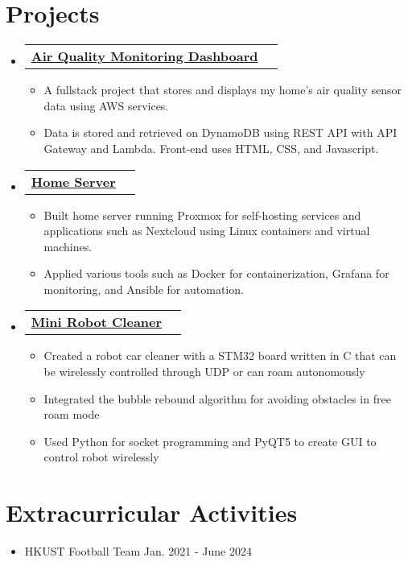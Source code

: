\documentclass[letterpaper,12pt]{article}
\makeatletter
\newcommand{\resumeItem}[1]{
  \item\small{
    {#1 \vspace{-2pt}}
  }
}
\newcommand{\resumeProjectHeading}[2]{
    \item
    \begin{tabular*}{0.97\textwidth}{l@{\extracolsep{\fill}}r}
      \small#1 & #2 \\
    \end{tabular*}\vspace{-7pt}
}
\newcommand{\resumeSubHeadingListStart}{\begin{itemize}[leftmargin=0.05in, label={}]}
\newcommand{\resumeSubHeadingListEnd}{\end{itemize}}
\newcommand{\resumeItemListStart}{\begin{itemize}}
\newcommand{\resumeItemListEnd}{\end{itemize}\vspace{-5pt}}
\makeatother
\begin{document}
\section{Projects}
    \resumeSubHeadingListStart
      

    \resumeProjectHeading
    {\textbf{\href{https://airqualitydashboard.jyylab.com/}{ {Air Quality Monitoring Dashboard}}}    \emph{}}{}
    \resumeItemListStart
      \resumeItem{\normalsize{A fullstack project that stores and displays my home's air quality sensor data using AWS services.}} 
      \resumeItem{\normalsize{Data is stored and retrieved on DynamoDB using REST API with API Gateway and Lambda. Front-end uses HTML, CSS, and Javascript.}}
    \resumeItemListEnd

      \resumeProjectHeading
      {\textbf{\href{https://github.com/jamesyoung-15/homeserver}{ {Home Server}}} \emph{}}{}
      \resumeItemListStart
        \resumeItem{\normalsize{Built home server running Proxmox for self-hosting services and applications such as Nextcloud using Linux containers and virtual machines.}}
        \resumeItem{\normalsize{Applied various tools such as Docker for containerization, Grafana for monitoring, and Ansible for automation.}}
      \resumeItemListEnd

    \resumeProjectHeading
    {\textbf{\href{https://github.com/jamesyoung-15/Mini-Robot-Cleaner}{ {Mini Robot Cleaner}}}    \emph{}}{}
    \resumeItemListStart
      \resumeItem{\normalsize{Created a robot car cleaner with a STM32 board written in C that can be wirelessly controlled through UDP or can roam autonomously}} 
      \resumeItem{\normalsize{Integrated the bubble rebound algorithm for avoiding obstacles in free roam mode}}
      \resumeItem{\normalsize{Used Python for socket programming and PyQT5 to create GUI to control robot wirelessly}}
    \resumeItemListEnd



    \resumeSubHeadingListEnd




\section{Extracurricular Activities}
    \begin{itemize}[itemsep=-2pt, parsep=5pt] 
        \item  {HKUST Football Team \hfill Jan. 2021 - June 2024}
    \end{itemize}
\end{document}

